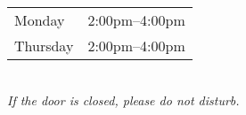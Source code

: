 \documentclass{msofficehours}
\begin{document}
\LARGE
  \begin{center}
    \begin{tabular}{lc}
    Monday & 2:00pm--4:00pm\\
    Thursday & 2:00pm--4:00pm\\
    \end{tabular}\\
    \vfill
    \textit{If the door is closed, please do not disturb.}
   \end{center}
\end{document}
